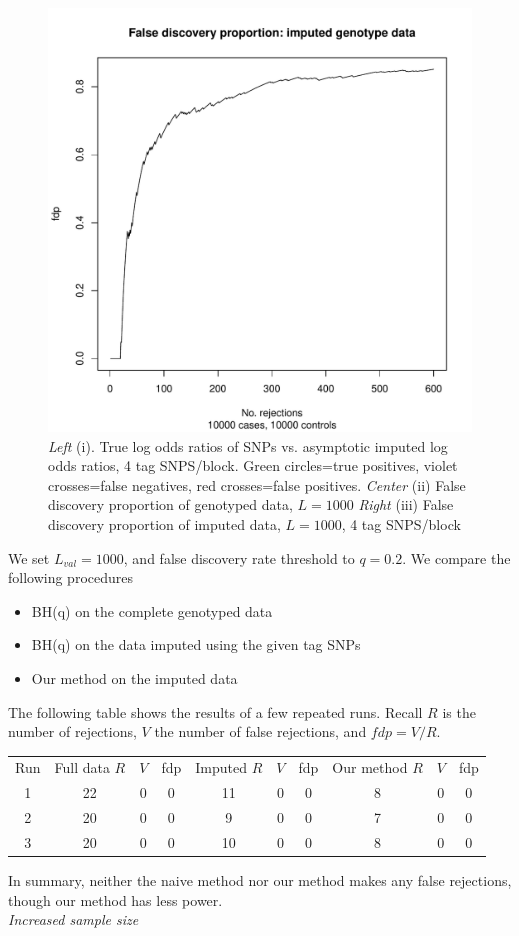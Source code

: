 \documentclass[12pt]{article}
\begin{document}
\begin{figure}[h]
\includegraphics[scale=0.25]{impute_g6.pdf}
\caption{\emph{Left} (i). True log odds ratios of SNPs vs. asymptotic
imputed log odds ratios, 4 tag SNPS/block.  Green circles=true positives, violet
crosses=false negatives, red crosses=false positives.  \emph{Center}
(ii) False discovery proportion of genotyped data, $L=1000$
 \emph{Right} (iii) False discovery proportion of imputed data,
 $L=1000$, 4 tag SNPS/block}
\end{figure}

We set $L_{val} = 1000$, and false discovery rate threshold to
$q=0.2$.
We compare the following procedures
\begin{itemize}
\item BH(q) on the complete genotyped data
\item BH(q) on the data imputed using the given tag SNPs
\item Our method on the imputed data
\end{itemize}
The following table shows the results of a few repeated runs.
Recall $R$ is the number of rejections, $V$ the number of false
rejections, and $fdp = V/R$.

\noindent
\begin{tabular}{|c|ccc|ccc|ccc|}
\hline
Run & Full data $R$ & $V$ & fdp & Imputed $R$ & $V$ & fdp & Our method
$R$ & $V$ & fdp\\
1 & 22 & 0 & 0 & 11 & 0 & 0 & 8 & 0 & 0\\
2 & 20 & 0 & 0 & 9 & 0 & 0 & 7 & 0 & 0\\
3 & 20 & 0 & 0 & 10 & 0 & 0 & 8 & 0 & 0\\
\hline
\end{tabular}
In summary, neither the naive method nor our method makes
any false rejections, though our method has less power.
\[\]
\noindent\emph{Increased sample size}
\end{document}

